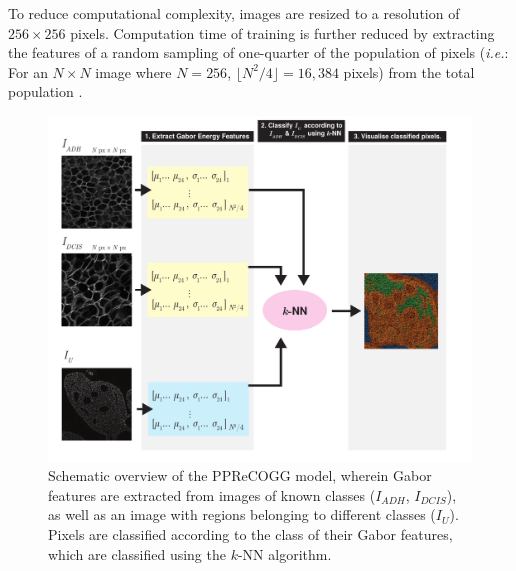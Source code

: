 To reduce computational complexity, images are resized to a resolution of
$256\times256$ pixels. Computation time of training is further reduced by
extracting the features of a random sampling of one-quarter of the population of pixels 
(\emph{i.e.}: For an $N \times N$ image where $N=256$, $\lfloor N^2/4 \rfloor = 16,384$ pixels) from the total population .

\begin{figure}[ht!]
	\centering
	\includegraphics[width=180mm]{figures/pprecogg_summary.pdf}
	\caption{Schematic overview of the PPReCOGG model, wherein Gabor features are extracted from images of known classes ($I_{ADH}$, $I_{DCIS}$), as well as an image with regions belonging to different classes ($I_U$). Pixels are classified according to the class of their Gabor features, which are classified using the $k$-NN algorithm. \label{pprecogg_summary}}
	
\end{figure}







